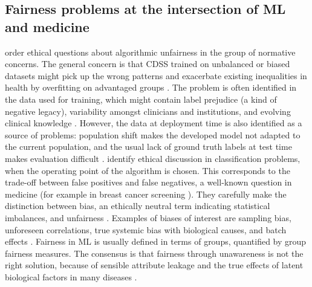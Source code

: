 \subsection{Fairness problems at the intersection of ML and medicine}
\cite{Morley2020} order ethical questions about algorithmic unfairness in the group of normative concerns.
The general concern is that CDSS trained on unbalanced or biased datasets might pick up the wrong patterns and exacerbate existing inequalities in health by overfitting on advantaged groups \cite{Morley2020}\cite{Chen2021}.
The problem is often identified in the data used for training, which might contain label prejudice (a kind of negative legacy), variability amongst clinicians and institutions, and evolving clinical knowledge \cite{Chen2021}.
However, the data at deployment time is also identified as a source of problems: population shift makes the developed model not adapted to the current population, and the usual lack of ground truth labels at test time makes evaluation difficult \cite{Chen2021}.
\cite{Fletcher2021} identify ethical discussion in classification problems, when the operating point of the algorithm is chosen.
This corresponds to the trade-off between false positives and false negatives, a well-known question in medicine (for example in breast cancer screening \cite{Fletcher2021}).
They carefully make the distinction between bias, an ethically neutral term indicating statistical imbalances, and unfairness \cite[p.~6]{Fletcher2021}.
Examples of biases of interest are sampling bias, unforeseen correlations, true systemic bias with biological causes, and batch effects \cite{Fletcher2021}.
Fairness in ML is usually defined in terms of groups, quantified by group fairness measures.
The consensus is that fairness through unawareness is not the right solution, because of sensible attribute leakage and the true effects of latent biological factors in many diseases \cite{Chen2021}.



